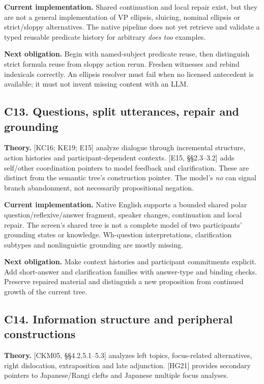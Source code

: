 \documentclass[11pt,a4paper]{article}
\begin{document}
\textbf{Current implementation.} Shared continuation and local repair
exist, but they are not a general implementation of VP ellipsis,
sluicing, nominal ellipsis or strict/sloppy alternatives. The native
pipeline does not yet retrieve and validate a typed reusable predicate
history for arbitrary \emph{does too} examples.

\textbf{Next obligation.} Begin with named-subject predicate reuse, then
distinguish strict formula reuse from sloppy action rerun. Freshen
witnesses and rebind indexicals correctly. An ellipsis resolver must
fail when no licensed antecedent is available; it must not invent
missing content with an LLM.

\subsection{C13. Questions, split utterances, repair and
grounding}\label{c13.-questions-split-utterances-repair-and-grounding}

\textbf{Theory.} {[}KC16; KE19; E15{]} analyze dialogue through
incremental structure, action histories and participant-dependent
contexts. {[}E15, §§2.3--3.2{]} adds self/other coordination pointers to
model feedback and clarification. These are distinct from the semantic
tree's construction pointer. The model's \emph{no} can signal branch
abandonment, not necessarily propositional negation.

\textbf{Current implementation.} Native English supports a bounded
shared polar question/reflexive/answer fragment, speaker changes,
continuation and local repair. The screen's shared tree is not a
complete model of two participants' grounding states or knowledge.
Wh-question interpretations, clarification subtypes and nonlinguistic
grounding are mostly missing.

\textbf{Next obligation.} Make context histories and participant
commitments explicit. Add short-answer and clarification families with
answer-type and binding checks. Preserve repaired material and
distinguish a new proposition from continued growth of the current tree.

\subsection{C14. Information structure and peripheral
constructions}\label{c14.-information-structure-and-peripheral-constructions}

\textbf{Theory.} {[}CKM05, §§4.2,5.1--5.3{]} analyzes left topics,
focus-related alternatives, right dislocation, extraposition and late
adjunction. {[}HG21{]} provides secondary pointers to Japanese/Rangi
clefts and Japanese multiple focus analyses.
\end{document}
